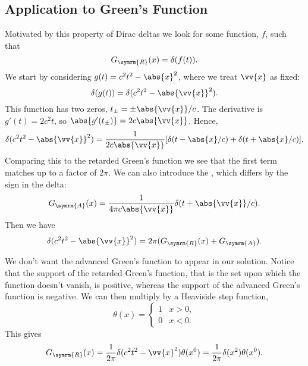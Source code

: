 \subsection{Application to Green's Function}
Motivated by this property of Dirac deltas we look for some function, \(f\), such that
\begin{equation}
    G_{\symrm{R}}(x) = \delta(f(t)).
\end{equation}
We start by considering \(g(t) = c^2t^2 - \abs{x}^2\), where we treat \(\vv{x}\) as fixed:
\begin{equation}
    \delta(g(t)) = \delta(c^2 t^2 - \abs{\vv{x}}^2).
\end{equation}
This function has two zeros, \(t_{\pm} = \pm \abs{\vv{x}}/c\).
The derivative is \(g'(t) = 2c^2t\), so \(\abs{g'(t_{\pm})} = 2c\abs{\vv{x}}\).
Hence,
\begin{equation}
    \delta(c^2t^2 - \abs{\vv{x}}^2) = \frac{1}{2c\abs{\vv{x}}} [\delta(t - \abs{x}/c) + \delta(t + \abs{x}/c)].
\end{equation}
Comparing this to the retarded Green's function we see that the first term matches up to a factor of \(2\pi\).
We can also introduce the , which differs by the sign in the delta:
\begin{equation}
    G_{\symrm{A}}(x) = \frac{1}{4\pi c\abs{\vv{x}}} \delta(t + \abs{\vv{x}}/c).
\end{equation}
Then we have
\begin{equation}
    \delta(c^2 t^2 - \abs{\vv{x}}^2) = 2\pi (G_{\symrm{R}}(x) + G_{\symrm{A}}).
\end{equation}

We don't want the advanced Green's function to appear in our solution.
Notice that the support of the retarded Green's function, that is the set upon which the function doesn't vanish, is positive, whereas the support of the advanced Green's function is negative.
We can then multiply by a Heaviside step function,
\begin{equation}
    \theta(x) = 
    \begin{cases}
        1 & x > 0,\\
        0 & x < 0.
    \end{cases}
\end{equation}
This gives
\begin{equation}
    G_{\symrm{R}}(x) = \frac{1}{2\pi} \delta(c^2t^2 - \vv{x}^2) \theta(x^0) = \frac{1}{2\pi} \delta(x^2) \theta(x^0).
\end{equation}


